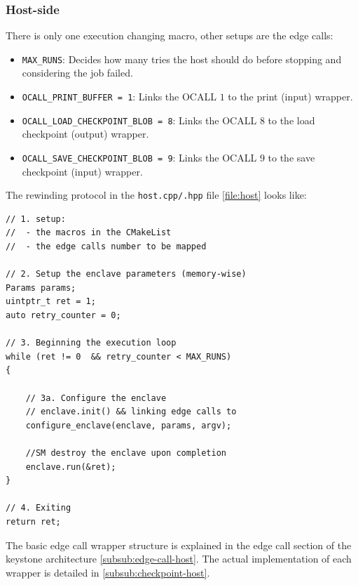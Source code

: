 \documentclass[11pt,a4paper]{report}
\begin{document}
\subsubsection{Host-side}
There is only one execution changing macro, other setups are the edge calls:
\begin{itemize}
    \item \verb|MAX_RUNS|: Decides how many tries the host should do before stopping and considering the job failed.
    \item \verb|OCALL_PRINT_BUFFER = 1|: Links the OCALL $1$ to the print (input) wrapper.
    \item \verb|OCALL_LOAD_CHECKPOINT_BLOB = 8|: Links the OCALL $8$ to the load checkpoint (output) wrapper.
    \item \verb|OCALL_SAVE_CHECKPOINT_BLOB = 9|: Links the OCALL $9$ to the save checkpoint (input) wrapper.
\end{itemize}
The rewinding protocol in the \verb|host.cpp/.hpp| file \ref{file:host} looks like:
\begin{verbatim}
// 1. setup:
//  - the macros in the CMakeList 
//  - the edge calls number to be mapped

// 2. Setup the enclave parameters (memory-wise)
Params params;
uintptr_t ret = 1;
auto retry_counter = 0;

// 3. Beginning the execution loop
while (ret != 0  && retry_counter < MAX_RUNS) 
{

    // 3a. Configure the enclave
    // enclave.init() && linking edge calls to 
    configure_enclave(enclave, params, argv); 

    //SM destroy the enclave upon completion
    enclave.run(&ret); 
}

// 4. Exiting
return ret;
\end{verbatim}
The basic edge call wrapper structure is explained in the edge call section of the keystone architecture \ref{subsub:edge-call-host}.
The actual implementation of each wrapper is detailed in \ref{subsub:checkpoint-host}.
\end{document}
